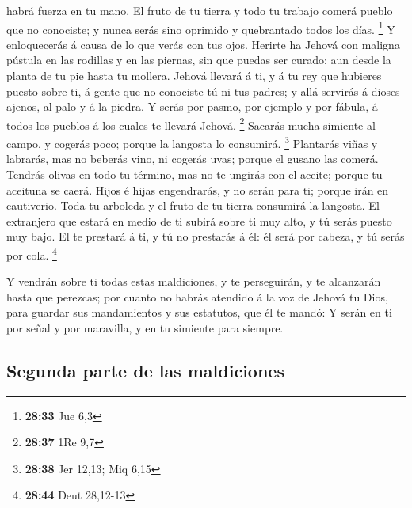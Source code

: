 habrá fuerza en tu mano.  El fruto de tu tierra y todo tu
trabajo comerá pueblo que no conociste; y nunca serás sino oprimido y
quebrantado todos los días. \footnote{\textbf{28:33} Jue 6,3}
 Y enloquecerás á causa de lo que verás con tus ojos.
 Herirte ha Jehová con maligna pústula en las rodillas y en
las piernas, sin que puedas ser curado: aun desde la planta de tu pie
hasta tu mollera.  Jehová llevará á ti, y á tu rey que
hubieres puesto sobre ti, á gente que no conociste tú ni tus padres; y
allá servirás á dioses ajenos, al palo y á la piedra.  Y
serás por pasmo, por ejemplo y por fábula, á todos los pueblos á los
cuales te llevará Jehová. \footnote{\textbf{28:37} 1Re 9,7}
 Sacarás mucha simiente al campo, y cogerás poco; porque la
langosta lo consumirá. \footnote{\textbf{28:38} Jer 12,13; Miq 6,15}
 Plantarás viñas y labrarás, mas no beberás vino, ni
cogerás uvas; porque el gusano las comerá.  Tendrás olivas
en todo tu término, mas no te ungirás con el aceite; porque tu aceituna
se caerá.  Hijos é hijas engendrarás, y no serán para ti;
porque irán en cautiverio.  Toda tu arboleda y el fruto de
tu tierra consumirá la langosta.  El extranjero que estará
en medio de ti subirá sobre ti muy alto, y tú serás puesto muy bajo.
 El te prestará á ti, y tú no prestarás á él: él será por
cabeza, y tú serás por cola. \footnote{\textbf{28:44} Deut 28,12-13}

 Y vendrán sobre ti todas estas maldiciones, y te
perseguirán, y te alcanzarán hasta que perezcas; por cuanto no habrás
atendido á la voz de Jehová tu Dios, para guardar sus mandamientos y sus
estatutos, que él te mandó:  Y serán en ti por señal y por
maravilla, y en tu simiente para siempre.

\hypertarget{segunda-parte-de-las-maldiciones}{%
\subsection{Segunda parte de las
maldiciones}\label{segunda-parte-de-las-maldiciones}}

